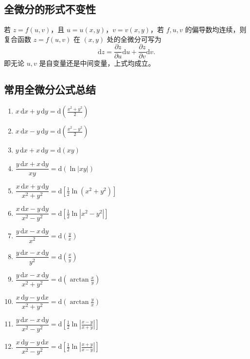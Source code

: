 \subsection{全微分的形式不变性}

若 $z = f(u, v)$，且 $u = u(x, y)$，$v = v(x, y)$，若 $f, u, v$ 的偏导数均连续，则复合函数 $z = f(u, v)$ 在 $(x, y)$ 处的全微分可写为
\[
    \mathrm{d}z = \frac{\partial z}{\partial u} \mathrm{d}u + \frac{\partial z}{\partial v} \mathrm{d}v.
\]
即无论 $u, v$ 是自变量还是中间变量，上式均成立。

\subsection{常用全微分公式总结}

\begin{multicols}{2}
    \begin{enumerate}
        \item $x\,\mathrm{d}x + y\,\mathrm{d}y = \mathrm{d}\!\left(\frac{x^{2}+y^{2}}{2}\right)$
        \item $x\,\mathrm{d}x - y\,\mathrm{d}y = \mathrm{d}\!\left(\frac{x^{2}-y^{2}}{2}\right)$
        \item $y\,\mathrm{d}x + x\,\mathrm{d}y = \mathrm{d}(xy)$
        \item $\dfrac{y\,\mathrm{d}x + x\,\mathrm{d}y}{xy} = \mathrm{d}(\ln|xy|)$
        \item $\dfrac{x\,\mathrm{d}x + y\,\mathrm{d}y}{x^{2}+y^{2}} = \mathrm{d}\!\left[\frac{1}{2}\ln(x^{2}+y^{2})\right]$
        \item $\dfrac{x\,\mathrm{d}x - y\,\mathrm{d}y}{x^{2}-y^{2}} = \mathrm{d}\!\left[\frac{1}{2}\ln|x^{2}-y^{2}|\right]$
        \item $\dfrac{y\,\mathrm{d}x - x\,\mathrm{d}y}{x^{2}} = \mathrm{d}\!\left(\frac{y}{x}\right)$
        \item $\dfrac{y\,\mathrm{d}x - x\,\mathrm{d}y}{y^{2}} = \mathrm{d}\!\left(\frac{x}{y}\right)$
        \item $\dfrac{y\,\mathrm{d}x - x\,\mathrm{d}y}{x^{2}+y^{2}} = \mathrm{d}\!\left(\arctan\frac{x}{y}\right)$
        \item $\dfrac{x\,\mathrm{d}y - y\,\mathrm{d}x}{x^{2}+y^{2}} = \mathrm{d}\!\left(\arctan\frac{y}{x}\right)$
        \item $\dfrac{y\,\mathrm{d}x - x\,\mathrm{d}y}{x^{2}-y^{2}} = \mathrm{d}\!\left[\frac{1}{2}\ln\left|\frac{x-y}{x+y}\right|\right]$
        \item $\dfrac{x\,\mathrm{d}y - y\,\mathrm{d}x}{x^{2}-y^{2}} = \mathrm{d}\!\left[\frac{1}{2}\ln\left|\frac{x+y}{x-y}\right|\right]$

\end{enumerate}
\end{multicols}
